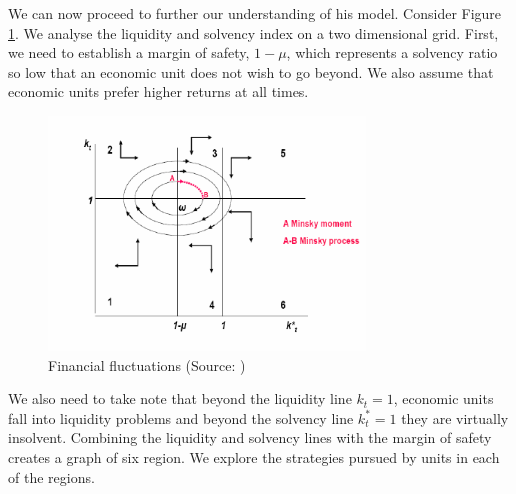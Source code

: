 \documentclass[a4paper, 12pt]{article}
\begin{document}
	We can now proceed to further our understanding of his model. Consider Figure \ref{fig:financial_fluctuations}. We analyse the liquidity and solvency index on a two dimensional grid. First, we need to establish a margin of safety, $1 - \mu$, which represents a solvency ratio so low that an economic unit does not wish to go beyond. We also assume that economic units prefer higher returns at all times.
	
	\begin{figure}[h]
		\centering
		\includegraphics*[width=0.75\textwidth]{Data/financial_fluctuations.png}
		\caption[Financial Fluctuations]{Financial fluctuations (Source: \cite{vercelli2009perspective})}
		\label{fig:financial_fluctuations}
	\end{figure}

	We also need to take note that beyond the liquidity line $k_t = 1$, economic units fall into liquidity problems and beyond the solvency line $k^*_t = 1$ they are virtually insolvent. Combining the liquidity and solvency lines with the margin of safety creates a graph of six region. We explore the strategies pursued by units in each of the regions.
	
\end{document}
